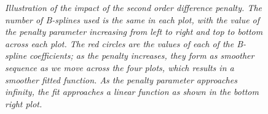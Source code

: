 \begin{figure}[H]
   \vspace*{3mm}
\caption{\textit{Illustration of the impact of the second order difference penalty. The number of B-splines used is the same in each plot, with the value of the penalty parameter increasing from left to right and top to bottom across each plot. The red circles are the values of each of the B-spline coefficients; as the penalty increases, they form as smoother sequence as we move across the four plots, which results in a smoother fitted function. As the penalty parameter approaches infinity, the fit approaches a linear function as shown in the bottom right plot.}}
\label{fig:increasing-lambda-pspline-fits}
\end{figure}
